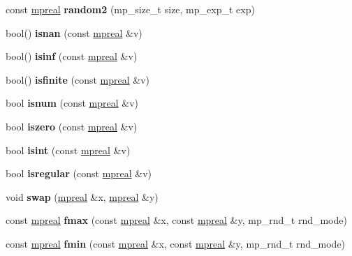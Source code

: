 \begin{DoxyCompactItemize}
\item 
\mbox{\label{classmpfr_1_1mpreal_af7d51c2394ee29d49701d21d18807f63}} 
const \hyperlink{classmpfr_1_1mpreal}{mpreal} {\bfseries random2} (mp\+\_\+size\+\_\+t size, mp\+\_\+exp\+\_\+t exp)
\item 
\mbox{\label{classmpfr_1_1mpreal_ae5a94d2e143c07951b7240ac95390df7}} 
bool() {\bfseries isnan} (const \hyperlink{classmpfr_1_1mpreal}{mpreal} \&v)
\item 
\mbox{\label{classmpfr_1_1mpreal_a7699954862f6fb59ee3905d124694608}} 
bool() {\bfseries isinf} (const \hyperlink{classmpfr_1_1mpreal}{mpreal} \&v)
\item 
\mbox{\label{classmpfr_1_1mpreal_a70a81c885e2fefe53c850d82989925f2}} 
bool() {\bfseries isfinite} (const \hyperlink{classmpfr_1_1mpreal}{mpreal} \&v)
\item 
\mbox{\label{classmpfr_1_1mpreal_aecd109d7efc9f5fbcdd6ff180a9361fd}} 
bool {\bfseries isnum} (const \hyperlink{classmpfr_1_1mpreal}{mpreal} \&v)
\item 
\mbox{\label{classmpfr_1_1mpreal_aced5c3fe849c0f4f4717f1f4b4217932}} 
bool {\bfseries iszero} (const \hyperlink{classmpfr_1_1mpreal}{mpreal} \&v)
\item 
\mbox{\label{classmpfr_1_1mpreal_aa71f5e9cfce9c94c285bf7e2be87df9c}} 
bool {\bfseries isint} (const \hyperlink{classmpfr_1_1mpreal}{mpreal} \&v)
\item 
\mbox{\label{classmpfr_1_1mpreal_aab30c989272836557b19153ccc190835}} 
bool {\bfseries isregular} (const \hyperlink{classmpfr_1_1mpreal}{mpreal} \&v)
\item 
\mbox{\label{classmpfr_1_1mpreal_abe1580967102f81bd80296c994d72291}} 
void {\bfseries swap} (\hyperlink{classmpfr_1_1mpreal}{mpreal} \&x, \hyperlink{classmpfr_1_1mpreal}{mpreal} \&y)
\item 
\mbox{\label{classmpfr_1_1mpreal_a5be6da7887c64b9b21b85eaf8d59413a}} 
const \hyperlink{classmpfr_1_1mpreal}{mpreal} {\bfseries fmax} (const \hyperlink{classmpfr_1_1mpreal}{mpreal} \&x, const \hyperlink{classmpfr_1_1mpreal}{mpreal} \&y, mp\+\_\+rnd\+\_\+t rnd\+\_\+mode)
\item 
\mbox{\label{classmpfr_1_1mpreal_ac0048f8d05e51456ab39ec5e8e19b9e4}} 
const \hyperlink{classmpfr_1_1mpreal}{mpreal} {\bfseries fmin} (const \hyperlink{classmpfr_1_1mpreal}{mpreal} \&x, const \hyperlink{classmpfr_1_1mpreal}{mpreal} \&y, mp\+\_\+rnd\+\_\+t rnd\+\_\+mode)
\end{DoxyCompactItemize}


